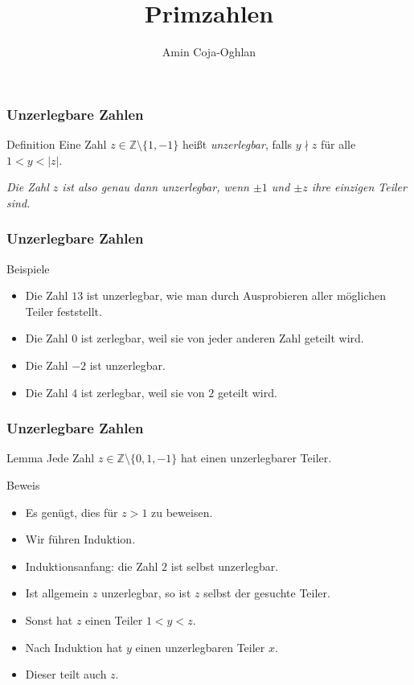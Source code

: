 \documentclass{beamer}
\title[Linadi]{Primzahlen}
\author[Amin Coja-Oghlan]{Amin Coja-Oghlan}
\institute[Frankfurt]{JWGUFFM}
\date{}
\renewcommand{\emph}[1]{{\textcolor{solarizedRed}{\itshape #1}}}
\newcommand\ZZ{\mathbb Z}
\renewcommand{\oe}{\"o}
\newcommand{\ue}{\"u}
\begin{document}
\frame[plain]{\titlepage}

\begin{frame}\frametitle{Unzerlegbare Zahlen}
	\begin{block}{Definition}
		Eine Zahl $z\in\ZZ\setminus\{1,-1\}$ hei\ss t \emph{unzerlegbar}, falls $y\nmid z$ f\ue r alle $1<y<|z|$.
	\end{block}

	\bigskip
	{\itshape Die Zahl $z$ ist also genau dann unzerlegbar, wenn $\pm1$ und $\pm z$ ihre einzigen Teiler sind.}
\end{frame}

\begin{frame}\frametitle{Unzerlegbare Zahlen}
	\begin{block}{Beispiele}
		\begin{itemize}
			\item Die Zahl $13$ ist unzerlegbar, wie man durch Ausprobieren aller m\oe glichen Teiler feststellt.
			\item Die Zahl $0$ ist zerlegbar, weil sie von jeder anderen Zahl geteilt wird.
			\item Die Zahl $-2$ ist unzerlegbar.
			\item Die Zahl $4$ ist zerlegbar, weil sie von $2$ geteilt wird.
		\end{itemize}
	\end{block}
\end{frame}

\begin{frame}\frametitle{Unzerlegbare Zahlen}
	\begin{block}{Lemma}
		Jede Zahl $z\in\ZZ\setminus\{0,1,-1\}$ hat einen unzerlegbarer Teiler.
	\end{block}
	\begin{block}{Beweis}
		\begin{itemize}
			\item Es gen\ue gt, dies f\ue r $z>1$ zu beweisen.
			\item Wir f\ue hren Induktion.
			\item Induktionsanfang: die Zahl $2$ ist selbst unzerlegbar.
			\item Ist allgemein $z$ unzerlegbar, so ist $z$ selbst der gesuchte Teiler.
			\item Sonst hat $z$ einen Teiler $1<y<z$.
			\item Nach Induktion hat $y$ einen unzerlegbaren Teiler $x$.
			\item Dieser teilt auch $z$.
		\end{itemize}	
	\end{block}
\end{frame}
\end{document}
